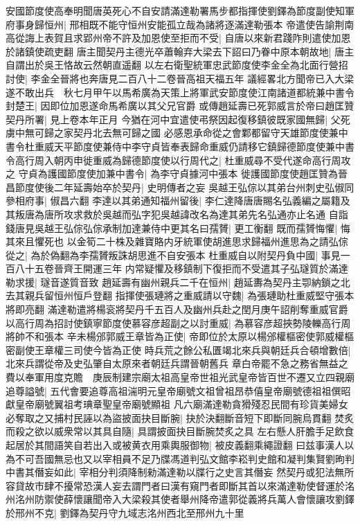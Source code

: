 安國節度使高奉明聞唐英死心不自安請滿達勒署馬步都指揮使劉鐸為節度副使知軍府事身歸恒州|{
	邢相既不能守恒州安能孤立哉為諸將逐滿達勒張本}
帝遣使告諭荆南高從誨上表賀且求郢州帝不許及加恩使至拒而不受|{
	自唐以來新君踐阼則遣使加恩於諸鎮使疏吏翻}
唐主聞契丹主德光卒蕭翰弃大梁去下詔曰乃眷中原本朝故地|{
	唐主自謂出於吳王恪故云然朝直遥翻}
以左右衛聖統軍忠武節度使李金全為北面行營招討使|{
	李金全晉將也奔唐見二百八十二卷晉高祖天福五年}
議經畧北方聞帝已入大梁遂不敢出兵　秋七月甲午以馬希廣為天策上將軍武安節度使江南諸道都統兼中書令封楚王|{
	因即位加恩遂命馬希廣以其父兄官爵}
或傳趙延壽已死郭威言於帝曰趙匡贊契丹所署|{
	見上卷本年正月}
今猶在河中宜遣使弔祭因起復移鎮彼既家國無歸|{
	父死虜中無可歸之家契丹北去無可歸之國}
必感恩承命從之會鄴都留守天雄節度使兼中書令杜重威天平節度使兼侍中李守貞皆奉表歸命重威仍請移它鎮歸德節度使兼中書令高行周入朝丙申徙重威為歸德節度使以行周代之|{
	杜重威尋不受代遂命高行周攻之}
守貞為護國節度使加兼中書令|{
	為李守貞據河中張本}
徙護國節度使趙匡贊為晉昌節度使後二年延壽始卒於契丹|{
	史明傳者之妄}
吳越王弘倧以其弟台州刺史弘俶同參相府事|{
	俶昌六翻}
李達以其弟通知福州留後|{
	李仁達降唐唐賜名弘義編之屬籍及其叛唐為唐所攻求救於吳越而弘字犯吳越諱改名為達其弟先名弘通亦止名通}
自詣錢唐見吳越王弘倧弘倧承制加達兼侍中更其名曰孺贇|{
	更工衡翻}
既而孺贇悔懼|{
	悔其來且懼死也}
以金筍二十株及雜寶賂内牙統軍使胡進思求歸福州進思為之請弘倧從之|{
	為於偽翻為李孺贇叛誅胡思進不自安張本}
杜重威自以附契丹負中國|{
	事見一百八十五卷晉齊王開運三年}
内常疑懼及移鎮制下復拒而不受遣其子弘璲質於滿達勒求援|{
	璲音遂質音致}
趙延壽有幽州親兵二千在恒州|{
	趙延夀為契丹主卾納鎖之北去其親兵留恒州恒戶登翻}
指揮使張璉將之重威請以守魏|{
	為張璉助杜重威堅守張本將即亮翻}
滿達勒遣將楊衮將契丹千五百人及幽州兵赴之閏月庚午詔削奪重威官爵以高行周為招討使鎮寧節度使慕容彦超副之以討重威|{
	為慕容彦超挾勢陵轢高行周將帥不和張本}
辛未楊邠郭威王章皆為正使|{
	帝即位於太原以楊邠權樞密使郭威權樞密副使王章權三司使今皆為正使}
時兵荒之餘公私匱竭北來兵與朝廷兵合頓增數倍|{
	北來兵謂從帝及史弘肇自太原來者朝廷兵謂晉朝舊兵}
章白帝罷不急之務省無益之費以奉軍用度克贍　庚辰制建宗廟太祖高皇帝世祖光武皇帝皆百世不遷又立四親廟追尊謚號|{
	五代會要追尊高祖湍明元皇帝廟號文祖曾祖昂恭僖皇帝廟號德祖祖僎昭獻皇帝廟號翼祖考琠章聖皇帝廟號顯祖}
凡六廟滿達勒貪猾殘忍民間有珍貨美婦女必奪取之又捕村民誣以為盜披面抉目斷腕|{
	抉於決翻斷音短下即斷同腕烏貫翻}
焚炙而殺之欲以威衆常以其具自隨|{
	具謂披面抉目斷腕焚炙之具}
左右懸人肝膽手足飲食起居於其間語笑自若出入或被黄衣用乘輿服御物|{
	被皮義翻乘繩證翻}
曰兹事漢人以為不可吾國無忌也又以宰相員不足乃牒馮道判弘文館李崧判史館和凝判集賢劉昫判中書其僭妄如此|{
	宰相分判須降制勑滿達勒以牒行之史言其僭妄}
然契丹或犯法無所容貸故市肆不擾常恐漢人妄去謂門者曰漢有窺門者即斷其首以來滿達勒使督運於洺州洺州防禦使薛懷讓聞帝入大梁殺其使者舉州降帝遣郭從義將兵萬人會懷讓攻劉鐸於邢州不克|{
	劉鐸為契丹守九域志洺州西北至邢州九十里}
